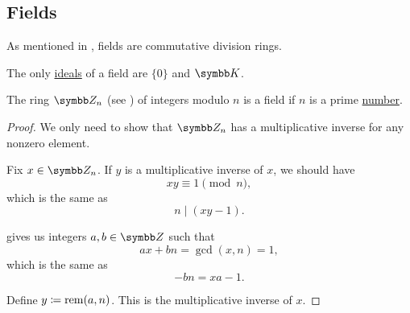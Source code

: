 \subsection{Fields}\label{subsec:fields}

\begin{Definition}\label{def:field}
  As mentioned in , fields are commutative division rings.
\end{Definition}

\begin{Proposition}\label{thm:ideals_of_field}
  The only \hyperref[def:semiring_ideal]{ideals} of a field are \( \{ 0 \} \) and \( \BK \).
\end{Proposition}

\begin{Theorem}\label{thm:ring_of_integers_module_prime_is_field}
  The ring \( \BZ_n \) (see ) of integers modulo \( n \) is a field if \( n \) is a prime \hyperref[def:prime_number]{number}.
\end{Theorem}
\begin{proof}
  We only need to show that \( \BZ_n \) has a multiplicative inverse for any nonzero element.

  Fix \( x \in \BZ_n \). If \( y \) is a multiplicative inverse of \( x \), we should have
  \begin{equation*}
    xy \equiv 1 \pmod n,
  \end{equation*}
  which is the same as
  \begin{equation*}
    n \mid (xy - 1).
  \end{equation*}

   gives us integers \( a, b \in \BZ \) such that
  \begin{equation*}
    ax + bn = \gcd(x, n) = 1,
  \end{equation*}
  which is the same as
  \begin{equation*}
    -bn = xa - 1.
  \end{equation*}

  Define \( y \coloneqq \operatorname{rem}(a, n) \). This is the multiplicative inverse of \( x \).
\end{proof}

